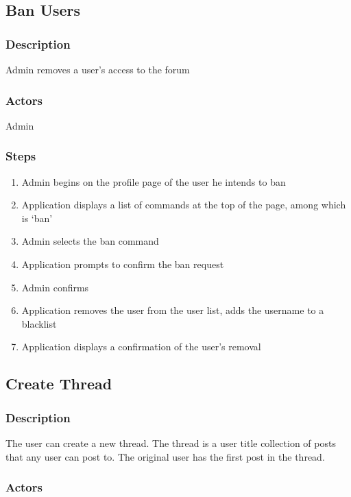 \documentclass[12pt]{scrartcl}
\begin{document}
\subsection{Ban Users}
\subsubsection{Description}
 
Admin removes a user’s access to the forum
 
\subsubsection{Actors}
 
Admin
 
\subsubsection{Steps}

\begin{enumerate}
\item Admin begins on the profile page of the user he intends to ban
\item Application displays a list of commands at the top of the page, among which is ‘ban’
\item Admin selects the ban command
\item Application prompts to confirm the ban request
\item Admin confirms
\item Application removes the user from the user list, adds the username to a blacklist
\item Application displays a confirmation of the user’s removal

\end {enumerate}

\subsection{Create Thread}
\subsubsection{Description}

The user can create a new thread. The thread is a user title collection of posts that any user can post to. The original user has the first post in the thread.

\subsubsection{Actors}
\end{document}
